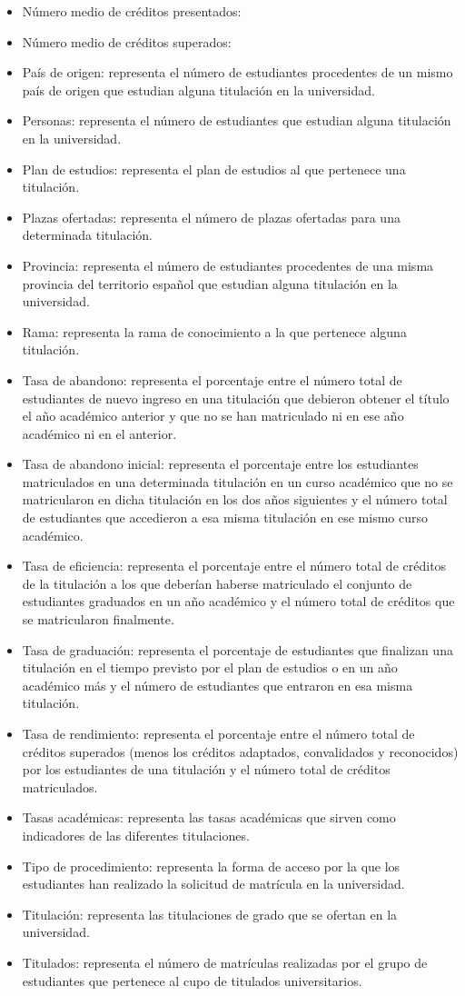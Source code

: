 \begin{itemize}
		\item Número medio de créditos presentados:
		\item Número medio de créditos superados:
		\item País de origen: representa el número de estudiantes procedentes de un mismo país de origen que estudian alguna titulación en la universidad.
		\item Personas: representa el número de estudiantes que estudian alguna titulación en la universidad.
		\item Plan de estudios: representa el plan de estudios al que pertenece una titulación.
		\item Plazas ofertadas: representa el número de plazas ofertadas para una determinada titulación.
		\item Provincia: representa el número de estudiantes procedentes de una misma provincia del territorio español que estudian alguna titulación en la universidad.
		\item Rama: representa la rama de conocimiento a la que pertenece alguna titulación.
		\item Tasa de abandono: representa el porcentaje entre el número total de estudiantes de nuevo ingreso en una titulación que debieron obtener el título el año académico anterior y que no se han matriculado ni en ese año académico ni en el anterior.
		\item Tasa de abandono inicial: representa el porcentaje entre los estudiantes matriculados en una determinada titulación en un curso académico que no se matricularon en dicha titulación en los dos años siguientes y el número total de estudiantes que accedieron a esa misma titulación en ese mismo curso académico.
		\item Tasa de eficiencia: representa el porcentaje entre el número total de créditos de la titulación a los que deberían haberse matriculado el conjunto de estudiantes graduados en un año académico y el número total de créditos que se matricularon finalmente.
		\item Tasa de graduación: representa el porcentaje de estudiantes que finalizan una titulación en el tiempo previsto por el plan de estudios o en un año académico más y el número de estudiantes que entraron en esa misma titulación.
		\item Tasa de rendimiento: representa el porcentaje entre el número total de créditos superados (menos los créditos adaptados, convalidados y reconocidos) por los estudiantes de una titulación y el número total de créditos matriculados.
		\item Tasas académicas: representa las tasas académicas que sirven como indicadores de las diferentes titulaciones.
		\item Tipo de procedimiento: representa la forma de acceso por la que los estudiantes han realizado la solicitud de matrícula en la universidad.
		\item Titulación: representa las titulaciones de grado que se ofertan en la universidad.
		\item Titulados: representa el número de matrículas realizadas por el grupo de estudiantes que pertenece al cupo de titulados universitarios.
\end{itemize}

